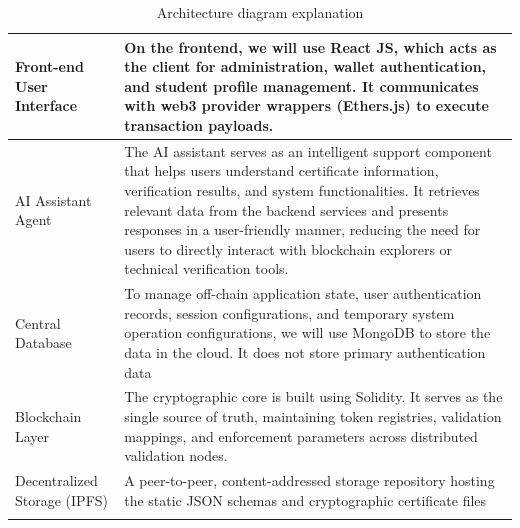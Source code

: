 

\begin{longtable}{|m{3.5cm}|m{10.5cm}|}

    \hline
    Front-end User Interface
     & On the frontend, we will use React JS, which acts as the client for administration, wallet authentication, and student profile management. It communicates with web3 provider wrappers (Ethers.js) to execute transaction payloads.                                                                                                                                                   \\
    \hline

    AI Assistant Agent
     & The AI assistant serves as an intelligent support component that helps users understand certificate information, verification results, and system functionalities. It retrieves relevant data from the backend services and presents responses in a user-friendly manner, reducing the need for users to directly interact with blockchain explorers or technical verification tools. \\
    \hline

    Central Database
     & To manage off-chain application state, user authentication records, session configurations, and temporary system operation configurations, we will use MongoDB to store the data in the cloud. It does not store primary authentication data                                                                                                                                          \\
    \hline

    Blockchain Layer
     & The cryptographic core is built using Solidity. It serves as the single source of truth, maintaining token registries, validation mappings, and enforcement parameters across distributed validation nodes.                                                                                                                                                                           \\
    \hline

    Decentralized Storage (IPFS)
     & A peer-to-peer, content-addressed storage repository hosting the static JSON schemas and cryptographic certificate files                                                                                                                                                                                                                                                              \\
    \hline


    \caption{Architecture diagram explanation}
    \label{tab:architect_diagram_explain}
\end{longtable}